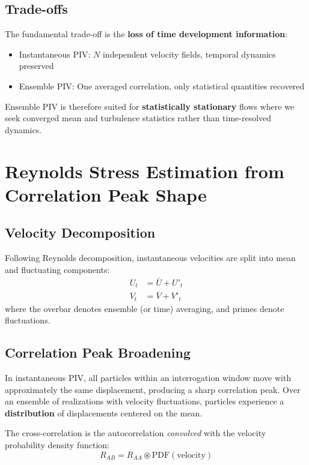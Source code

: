 \documentclass[11pt,a4paper]{article}
\begin{document}
\subsection{Trade-offs}

The fundamental trade-off is the \textbf{loss of time development information}:
\begin{itemize}
    \item Instantaneous PIV: $N$ independent velocity fields, temporal dynamics preserved
    \item Ensemble PIV: One averaged correlation, only statistical quantities recovered
\end{itemize}

Ensemble PIV is therefore suited for \textbf{statistically stationary} flows where we seek converged mean and turbulence statistics rather than time-resolved dynamics.

\section{Reynolds Stress Estimation from Correlation Peak Shape}

\subsection{Velocity Decomposition}

Following Reynolds decomposition, instantaneous velocities are split into mean and fluctuating components:
\begin{align}
    U_t &= \bar{U} + U'_t \\
    V_t &= \bar{V} + V'_t
\end{align}
where the overbar denotes ensemble (or time) averaging, and primes denote fluctuations.

\subsection{Correlation Peak Broadening}

In instantaneous PIV, all particles within an interrogation window move with approximately the same displacement, producing a sharp correlation peak. Over an ensemble of realizations with velocity fluctuations, particles experience a \textbf{distribution} of displacements centered on the mean.

The cross-correlation is the autocorrelation \emph{convolved} with the velocity probability density function:
\begin{equation}
    R_{AB} = R_{AA} \circledast \text{PDF}(\text{velocity})
\end{equation}
\end{document}
